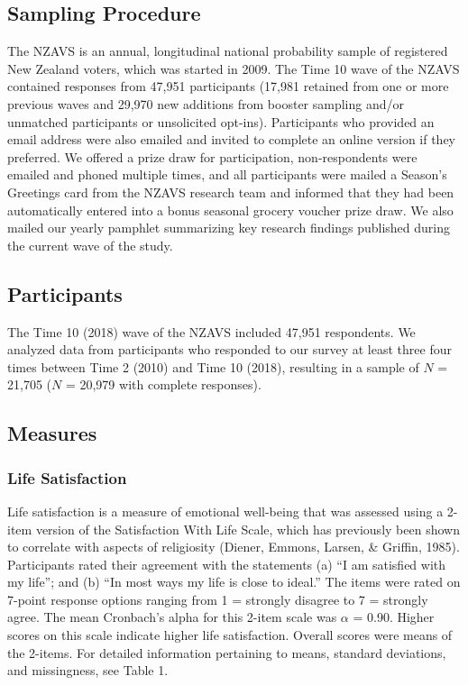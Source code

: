 \documentclass[
  english,
  man]{apa6}
\begin{document}
\hypertarget{sampling-procedure}{%
\subsection{Sampling Procedure}\label{sampling-procedure}}

The NZAVS is an annual, longitudinal national probability sample of registered New Zealand voters, which was started in 2009. The Time 10 wave of the NZAVS contained responses from 47,951 participants (17,981 retained from one or more previous waves and 29,970 new additions from booster sampling and/or unmatched participants or unsolicited opt-ins). Participants who provided an email address were also emailed and invited to complete an online version if they preferred. We offered a prize draw for participation, non-respondents were emailed and phoned multiple times, and all participants were mailed a Season's Greetings card from the NZAVS research team and informed that they had been automatically entered into a bonus seasonal grocery voucher prize draw. We also mailed our yearly pamphlet summarizing key research findings published during the current wave of the study.

\hypertarget{participants}{%
\subsection{Participants}\label{participants}}

The Time 10 (2018) wave of the NZAVS included 47,951 respondents. We analyzed data from participants who responded to our survey at least three four times between Time 2 (2010) and Time 10 (2018), resulting in a sample of \(N\) = 21,705 (\(N\) = 20,979 with complete responses).

\hypertarget{measures}{%
\subsection{Measures}\label{measures}}

\hypertarget{life-satisfaction}{%
\subsubsection{Life Satisfaction}\label{life-satisfaction}}

Life satisfaction is a measure of emotional well-being that was assessed using a 2-item version of the Satisfaction With Life Scale, which has previously been shown to correlate with aspects of religiosity (Diener, Emmons, Larsen, \& Griffin, 1985). Participants rated their agreement with the statements (a) \enquote{I am satisfied with my life}; and (b) \enquote{In most ways my life is close to ideal.} The items were rated on 7-point response options ranging from 1 = strongly disagree to 7 = strongly agree. The mean Cronbach's alpha for this 2-item scale was \(\alpha\) = 0.90. Higher scores on this scale indicate higher life satisfaction. Overall scores were means of the 2-items. For detailed information pertaining to means, standard deviations, and missingness, see Table 1.
\end{document}
